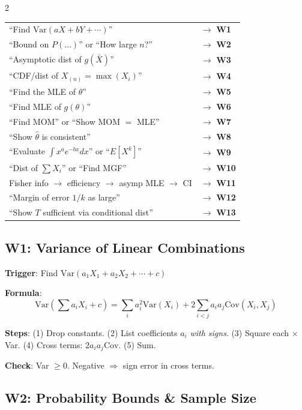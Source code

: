 \documentclass[8pt]{extarticle}
\begin{document}
\begin{multicols}{2}
\begin{tabular}{@{}ll@{}}
``Find $\text{Var}(aX+bY+\cdots)$'' & $\to$ \textbf{W1} \\
``Bound on $P(\ldots)$'' or ``How large $n$?'' & $\to$ \textbf{W2} \\
``Asymptotic dist of $g(\bar X)$'' & $\to$ \textbf{W3} \\
``CDF/dist of $X_{(n)} = \max(X_i)$'' & $\to$ \textbf{W4} \\
``Find the MLE of $\theta$'' & $\to$ \textbf{W5} \\
``Find MLE of $g(\theta)$'' & $\to$ \textbf{W6} \\
``Find MOM'' or ``Show MOM $=$ MLE'' & $\to$ \textbf{W7} \\
``Show $\hat\theta$ is consistent'' & $\to$ \textbf{W8} \\
``Evaluate $\int x^a e^{-bx}dx$'' or ``$E[X^k]$'' & $\to$ \textbf{W9} \\
``Dist of $\sum X_i$'' or ``Find MGF'' & $\to$ \textbf{W10} \\
Fisher info $\to$ efficiency $\to$ asymp MLE $\to$ CI & $\to$ \textbf{W11} \\
``Margin of error $1/k$ as large'' & $\to$ \textbf{W12} \\
``Show $T$ sufficient via conditional dist'' & $\to$ \textbf{W13} \\
\end{tabular}

\subsection{W1: Variance of Linear Combinations}

\textbf{Trigger}: Find $\text{Var}(a_1X_1 + a_2X_2 + \cdots + c)$

\textbf{Formula}:
$$\text{Var}\!\left(\sum a_iX_i + c\right) = \sum_i a_i^2\text{Var}(X_i) + 2\!\!\sum_{i<j} a_ia_j\text{Cov}(X_i,X_j)$$

\textbf{Steps}: (1) Drop constants. (2) List coefficients $a_i$ \emph{with signs}. (3) Square each $\times$ Var. (4) Cross terms: $2a_ia_j\text{Cov}$. (5) Sum.

\textbf{Check}: Var $\ge 0$. Negative $\Rightarrow$ sign error in cross terms.

\subsection{W2: Probability Bounds \& Sample Size}


\end{multicols}
\end{document}
